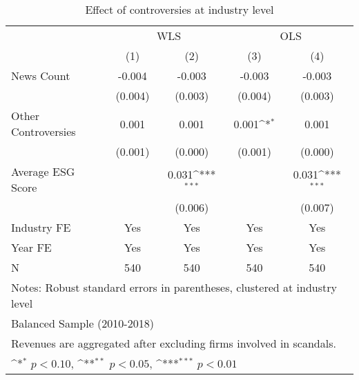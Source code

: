 \begin{table}[htbp]\centering
\def\sym#1{\ifmmode^{#1}\else\(^{#1}\)\fi}
\caption{Effect of controversies at industry level}
\begin{tabular}{l*{4}{c}}
\toprule
                    &\multicolumn{2}{c}{WLS}                    &\multicolumn{2}{c}{OLS}                    \\\cmidrule(lr){2-3}\cmidrule(lr){4-5}
                    &\multicolumn{1}{c}{(1)}         &\multicolumn{1}{c}{(2)}         &\multicolumn{1}{c}{(3)}         &\multicolumn{1}{c}{(4)}         \\
\midrule
News Count          &      -0.004         &      -0.003         &      -0.003         &      -0.003         \\
                    &     (0.004)         &     (0.003)         &     (0.004)         &     (0.003)         \\
\addlinespace
Other Controversies &       0.001         &       0.001         &       0.001\sym{*}  &       0.001         \\
                    &     (0.001)         &     (0.000)         &     (0.001)         &     (0.000)         \\
\addlinespace
Average ESG Score   &                     &       0.031\sym{***}&                     &       0.031\sym{***}\\
                    &                     &     (0.006)         &                     &     (0.007)         \\
\midrule
Industry FE         &         Yes         &         Yes         &         Yes         &         Yes         \\
Year FE             &         Yes         &         Yes         &         Yes         &         Yes         \\
N                   &         540         &         540         &         540         &         540         \\
\bottomrule
\multicolumn{5}{l}{\footnotesize Notes: Robust standard errors in parentheses, clustered at industry level}\\
\multicolumn{5}{l}{\footnotesize Balanced Sample (2010-2018)}\\
\multicolumn{5}{l}{\footnotesize Revenues are aggregated after excluding firms involved in scandals.}\\
\multicolumn{5}{l}{\footnotesize \sym{*} \(p<0.10\), \sym{**} \(p<0.05\), \sym{***} \(p<0.01\)}\\
\end{tabular}
\end{table}
